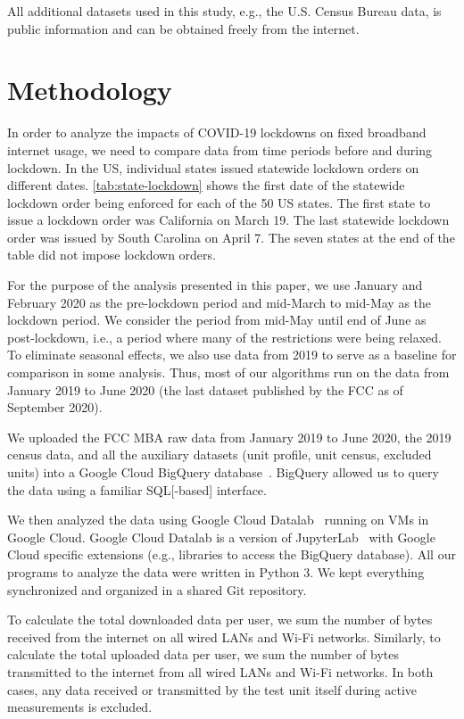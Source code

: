 \documentclass[conference,10pt]{IEEEtran}
\begin{document}
All additional datasets used in this study, e.g., the U.S. Census Bureau data, is public information and can be obtained freely from the internet.

\section{Methodology}\label{sec:methodology}

In order to analyze the impacts of COVID-19 lockdowns on fixed broadband internet usage, we need to compare data from time periods before and during lockdown. In the \gls{US}, individual states issued statewide lockdown orders on different dates. \cref{tab:state-lockdown} shows the first date of the statewide lockdown order being enforced for each of the 50 \gls{US} states. The first state to issue a lockdown order was California on March 19. The last statewide lockdown order was issued by South Carolina on April 7. The seven states at the end of the table did not impose lockdown orders.

For the purpose of the analysis presented in this paper, we use January and February 2020 as the pre-lockdown period and mid-March to mid-May as the lockdown period. We consider the period from mid-May until end of June as post-lockdown, i.e., a period where many of the restrictions were being relaxed. To eliminate seasonal effects, we also use data from 2019 to serve as a baseline for comparison in some analysis. Thus, most of our algorithms run on the data from January 2019 to June 2020 (the last dataset published by the \gls{FCC} as of September 2020).

We uploaded the \gls{FCC} \gls{MBA} raw data from January 2019 to June 2020, the 2019 census data, and all the auxiliary datasets (unit profile, unit census, excluded units) into a Google Cloud BigQuery database~\cite{bigquery}. BigQuery allowed us to query the data using a familiar \gls{SQL}[-based] interface.

We then analyzed the data using Google Cloud Datalab~\cite{datalab} running on \glspl{VM} in Google Cloud. Google Cloud Datalab is a version of JupyterLab~\cite{jupyter} with Google Cloud specific extensions (e.g., libraries to access the BigQuery database). All our programs to analyze the data were written in Python 3. We kept everything synchronized and organized in a shared Git repository.

To calculate the total downloaded data per user, we sum the number of bytes received from the internet on all wired \glspl{LAN} and Wi-Fi networks. Similarly, to calculate the total uploaded data per user, we sum the number of bytes transmitted to the internet from all wired \glspl{LAN} and Wi-Fi networks. In both cases, any data received or transmitted by the test unit itself during active measurements is excluded.
\end{document}
